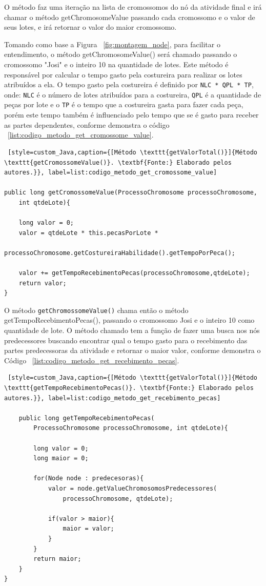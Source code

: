 \par O método faz uma iteração na lista de cromossomos do nó da atividade final e irá chamar o método getChromosomeValue passando 
cada cromossomo e o valor de seus lotes, e irá retornar o valor do maior cromossomo.

\par Tomando como base a Figura ~\ref{fig:montagem_node}, para facilitar o
entendimento, o método getChromosomeValue() será chamado passando o cromossomo "Josi" e o inteiro 10 na quantidade de lotes. 
Este método é responsável por calcular o tempo gasto 
pela costureira para realizar os lotes atribuídos a ela. O tempo gasto pela
costureira é definido por \texttt{NLC * QPL * TP}, onde: \texttt{NLC} é o número
de lotes atribuídos para a costureira, \texttt{QPL} é a quantidade de peças por
lote e o \texttt{TP} é o tempo que a costureira gasta para fazer cada peça, 
porém este tempo também é influenciado pelo tempo que se é gasto para receber 
as partes dependentes, conforme demonstra o código ~\ref{list:codigo_metodo_get_cromossome_value}.


\begin{lstlisting} [style=custom_Java,caption={[Método \texttt{getValorTotal()}]{Método \texttt{getCromossomeValue()}. \textbf{Fonte:} Elaborado pelos autores.}}, label=list:codigo_metodo_get_cromossome_value] 	

public long getCromossomeValue(ProcessoChromosome processoChromosome,
	int qtdeLote){
	
	long valor = 0;
	valor = qtdeLote * this.pecasPorLote *
		 processoChromosome.getCostureiraHabilidade().getTempoPorPeca();

	valor += getTempoRecebimentoPecas(processoChromosome,qtdeLote);
	return valor;
}

\end{lstlisting}

\par O método \texttt{getChromossomeValue()} chama então o método getTempoRecebimentoPecas(), passando o cromossomo Josi e 
o inteiro 10 como quantidade de lote. O método chamado tem a função de fazer uma busca nos nós predecessores buscando encontrar 
qual o tempo gasto para o recebimento das partes predecessoras da atividade e retornar o maior valor, 
conforme demonstra o Código ~\ref{list:codigo_metodo_get_recebimento_pecas}.

\begin{lstlisting} [style=custom_Java,caption={[Método \texttt{getValorTotal()}]{Método \texttt{getTempoRecebimentoPecas()}. \textbf{Fonte:} Elaborado pelos autores.}}, label=list:codigo_metodo_get_recebimento_pecas] 	

	public long getTempoRecebimentoPecas(
		ProcessoChromosome processoChromosome, int qtdeLote){
		
		long valor = 0;
		long maior = 0;
		
		for(Node node : predecesoras){
			valor = node.getValueChromosomosPredecessores(
				processoChromosome, qtdeLote);
			
			if(valor > maior){
				maior = valor;
			}
		}
		return maior;
	}
}

\end{lstlisting}


